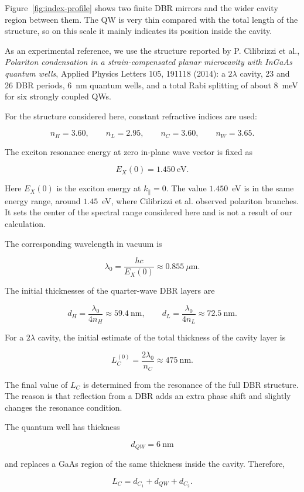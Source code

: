\documentclass[12pt,a4paper]{article}
\begin{document}
Figure~\ref{fig:index-profile} shows two finite DBR mirrors and the wider cavity region between them. The QW is very thin compared with the total length of the structure, so on this scale it mainly indicates its position inside the cavity.

As an experimental reference, we use the structure reported by P. Cilibrizzi et al., \textit{Polariton condensation in a strain-compensated planar microcavity with InGaAs quantum wells}, Applied Physics Letters 105, 191118 (2014): a $2\lambda$ cavity, 23 and 26 DBR periods, $6$~nm quantum wells, and a total Rabi splitting of about $8$~meV for six strongly coupled QWs.

For the structure considered here, constant refractive indices are used:

\[
n_H=3.60,\qquad n_L=2.95,\qquad n_C=3.60,\qquad n_W=3.65.
\]

The exciton resonance energy at zero in-plane wave vector is fixed as

\[
E_X(0)=1.450\ \mathrm{eV}.
\]

Here $E_X(0)$ is the exciton energy at $k_\parallel=0$. The value $1.450$~eV is in the same energy range, around $1.45$~eV, where Cilibrizzi et al. observed polariton branches. It sets the center of the spectral range considered here and is not a result of our calculation.

The corresponding wavelength in vacuum is

\[
\lambda_0=\frac{hc}{E_X(0)}\approx0.855\ \mu\mathrm m.
\]

The initial thicknesses of the quarter-wave DBR layers are

\[
d_H=\frac{\lambda_0}{4n_H}\approx59.4\ \mathrm{nm},
\qquad
 d_L=\frac{\lambda_0}{4n_L}\approx72.5\ \mathrm{nm}.
\]

For a $2\lambda$ cavity, the initial estimate of the total thickness of the cavity layer is

\[
L_C^{(0)}=\frac{2\lambda_0}{n_C}\approx475\ \mathrm{nm}.
\]

The final value of $L_C$ is determined from the resonance of the full DBR structure. The reason is that reflection from a DBR adds an extra phase shift and slightly changes the resonance condition.

The quantum well has thickness

\[
d_{QW}=6\ \mathrm{nm}
\]

and replaces a GaAs region of the same thickness inside the cavity. Therefore,

\[
L_C=d_{C_1}+d_{QW}+d_{C_2}.
\]
\end{document}
